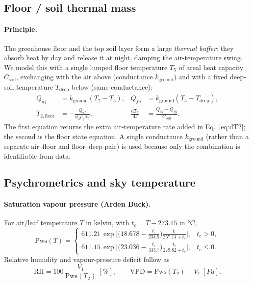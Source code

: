 \documentclass[11pt,a4paper]{article}
\newcommand{\dd}[2]{\frac{\mathrm{d}#1}{\mathrm{d}#2}}
\newcommand{\Tair}{T_{2}}
\newcommand{\Vair}{V_{1}}
\newcommand{\Tflo}{T_{5}}
\begin{document}
\subsection{Floor / soil thermal mass}\label{sec:floor}
\paragraph{Principle.} The greenhouse floor and the top soil layer form a large \emph{thermal
buffer}: they absorb heat by day and release it at night, damping the air-temperature swing. We
model this with a single lumped floor temperature $\Tflo$ of areal heat capacity $C_{\text{soil}}$,
exchanging with the air above (conductance $k_{\text{ground}}$) and with a fixed deep-soil
temperature $T_{\text{deep}}$ below (same conductance):
\begin{align}
  Q_{af} &= k_{\text{ground}}(\Tair - \Tflo), &
  Q_{fg} &= k_{\text{ground}}(\Tflo - T_{\text{deep}}),\\
  \dot{T}_{2,\text{floor}} &= -\frac{Q_{af}}{\phi_2\rho_3\alpha_5}, &
  \dd{\Tflo}{t} &= \frac{Q_{af}-Q_{fg}}{C_{\text{soil}}}.
  \label{eq:floor}
\end{align}
The first equation returns the extra air-temperature rate added in Eq.~\eqref{eq:dT2}; the second is
the floor state equation. A single conductance $k_{\text{ground}}$ (rather than a separate
air--floor and floor--deep pair) is used because only the combination is identifiable from data.

\subsection{Psychrometrics and sky temperature}\label{sec:psychro}\label{sec:sky}
\paragraph{Saturation vapour pressure (Arden Buck).} For air/leaf temperature $T$ in kelvin, with
$t_c=T-273.15$ in \si{\degreeCelsius},
\begin{equation}
  \mathrm{Pws}(T)=\begin{cases}
    611.21\,\exp\!\Big[\big(18.678-\tfrac{t_c}{234.5}\big)\tfrac{t_c}{257.14+t_c}\Big], & t_c>0,\\[4pt]
    611.15\,\exp\!\Big[\big(23.036-\tfrac{t_c}{333.7}\big)\tfrac{t_c}{279.82+t_c}\Big], & t_c\le 0.
  \end{cases}
\end{equation}
Relative humidity and vapour-pressure deficit follow as
\begin{equation}
  \mathrm{RH}=100\,\frac{\Vair}{\mathrm{Pws}(\Tair)}\ [\%], \qquad
  \mathrm{VPD}=\mathrm{Pws}(\Tair)-\Vair\ [\si{Pa}].
\end{equation}
\end{document}
